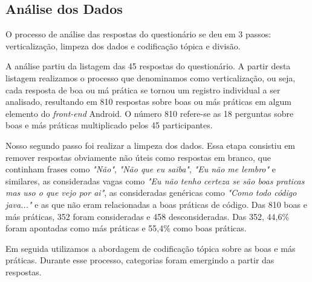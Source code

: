 \subsection{An\'alise dos Dados}
\label{sub:smells-definition}

O processo de análise das respostas do questionário se deu em 3 passos: verticaliza\c{c}\~ao, limpeza dos dados e codifica\c{c}\~ao t\'opica e divis\~ao.


A an\'alise partiu da listagem das 45 respostas do question\'ario. A partir desta listagem realizamos o processo que denominamos como verticaliza\c{c}\~ao, ou seja, cada resposta de boa ou m\'a pr\'atica se tornou um registro individual a ser analisado, resultando em 810 respostas sobre boas ou m\'as pr\'aticas em algum elemento do \textit{front-end} Android. O n\'umero 810 refere-se as 18 perguntas sobre boas e m\'as pr\'aticas multiplicado pelos 45 participantes.

Nosso segundo passo foi realizar a limpeza dos dados. Essa etapa consistiu em remover respostas obviamente n\~ao \'uteis como respostas em branco, que continham frases como \textit{"N\~ao"}, \textit{"N\~ao que eu saiba"}, \textit{"Eu n\~ao me lembro"} e similares, as consideradas vagas como \textit{"Eu n\~ao tenho certeza se s\~ao boas praticas mas uso o que vejo por ai"}, as consideradas gen\'ericas como \textit{"Como todo c\'odigo java..."} e as que n\~ao eram relacionadas a boas pr\'aticas de c\'odigo. Das 810 boas e m\'as pr\'aticas, 352 foram consideradas e 458 desconsideradas. Das 352, 44,6\% foram apontadas como m\'as pr\'aticas e 55,4\% como boas pr\'aticas. 

Em seguida utilizamos a abordagem de codifica\c{c}\~ao t\'opica sobre as boas e más práticas. Durante esse processo, categorias foram emergindo a partir das respostas.


